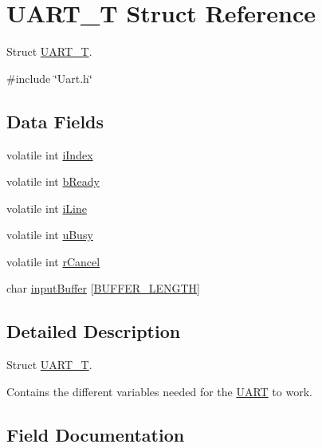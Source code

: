 \hypertarget{struct_u_a_r_t_1_1_u_a_r_t___t}{}\section{U\+A\+R\+T\+\_\+T Struct Reference}
\label{struct_u_a_r_t_1_1_u_a_r_t___t}


Struct \mbox{\hyperlink{struct_u_a_r_t_1_1_u_a_r_t___t}{U\+A\+R\+T\+\_\+T}}.  




{\ttfamily \#include \char`\"{}Uart.\+h\char`\"{}}

\subsection*{Data Fields}
\begin{DoxyCompactItemize}
\item 
volatile int \mbox{\hyperlink{struct_u_a_r_t_1_1_u_a_r_t___t_a54f54030cc41d7f220733e022d2f4df0}{i\+Index}}
\item 
volatile int \mbox{\hyperlink{struct_u_a_r_t_1_1_u_a_r_t___t_a8f2d43e22185dc1f3f4e5fcaacd0d559}{b\+Ready}}
\item 
volatile int \mbox{\hyperlink{struct_u_a_r_t_1_1_u_a_r_t___t_af24f69336f7db99e5523900be8c6cb93}{i\+Line}}
\item 
volatile int \mbox{\hyperlink{struct_u_a_r_t_1_1_u_a_r_t___t_a4b97414b016988708188b1911b464c46}{u\+Busy}}
\item 
volatile int \mbox{\hyperlink{struct_u_a_r_t_1_1_u_a_r_t___t_a54ac1ff09fc23246e68f05c8fe826a8c}{r\+Cancel}}
\item 
char \mbox{\hyperlink{struct_u_a_r_t_1_1_u_a_r_t___t_a3e02cd24d7ef63e42cbcced4084bd1c4}{input\+Buffer}} \mbox{[}\mbox{\hyperlink{group___u_a_r_t_gaf7b7dc9a200cb1404c280bd500fd1551}{B\+U\+F\+F\+E\+R\+\_\+\+L\+E\+N\+G\+TH}}\mbox{]}
\end{DoxyCompactItemize}


\subsection{Detailed Description}
Struct \mbox{\hyperlink{struct_u_a_r_t_1_1_u_a_r_t___t}{U\+A\+R\+T\+\_\+T}}. 

Contains the different variables needed for the \mbox{\hyperlink{namespace_u_a_r_t}{U\+A\+RT}} to work. 

\subsection{Field Documentation}
\mbox{\label{struct_u_a_r_t_1_1_u_a_r_t___t_a8f2d43e22185dc1f3f4e5fcaacd0d559}} 
